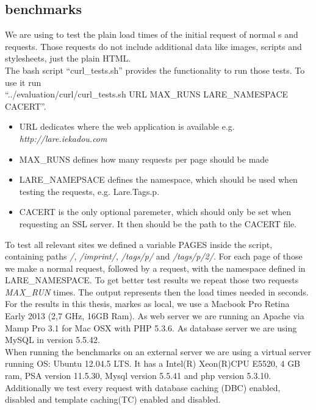 \subsection{\curl{} benchmarks\label{curl}}
We are using \curl{} to test the plain load times of the initial request of normal \httpRequest{}s and \lare{} requests.
Those \curl{} requests do not include additional data like images, scripts and stylesheets, just the plain HTML.
\\
The bash script \enquote{curl\_tests.sh} provides the functionality to run those \curl{} tests.
To use it run
\\
\enquote{../evaluation/curl/curl\_tests.sh URL MAX\_RUNS LARE\_NAMESPACE CACERT}.
\\
\begin{itemize}
    \item URL dedicates where the web application is available e.g. \emph{http://lare.iekadou.com}
    \item MAX\_RUNS defines how many \curl{} requests per page should be made
    \item LARE\_NAMEPSACE defines the namespace, which should be used when testing the \lare{} requests, e.g. Lare.Tags.p.
    \item CACERT is the only optional paremeter, which should only be set when requesting an SSL server. It then should be the path to the CACERT file.
\end{itemize}

\noindent{}To test all relevant sites we defined a variable PAGES inside the script, containing paths \emph{/}, \emph{/imprint/}, \emph{/tags/p/} and \emph{/tags/p/2/}.
For each page of those we make a normal request, followed by a \lare{} request, with the namespace defined in LARE\_NAMESPACE. 
To get better test results we repeat those two requests \emph{MAX\_RUN} times. The output represents then the load times needed in seconds.
\\
For the results in this thesis, markes as local, we use a Macbook Pro Retina Early 2013 (2,7 GHz, 16GB Ram).
As web server we are running an Apache via Mamp Pro 3.1 for Mac OSX with PHP 5.3.6.
As database server we are using MySQL in version 5.5.42.
\\
When running the benchmarks on an external server we are using a virtual server running OS: Ubuntu 12.04.5 LTS.
It has a Intel(R) Xeon(R)CPU E5520, 4 GB ram, PSA version 11.5.30, Mysql version 5.5.41 and php version 5.3.10.
\\
Additionally we test every request with database caching (DBC) enabled, disabled and template caching(TC) enabled and disabled.

